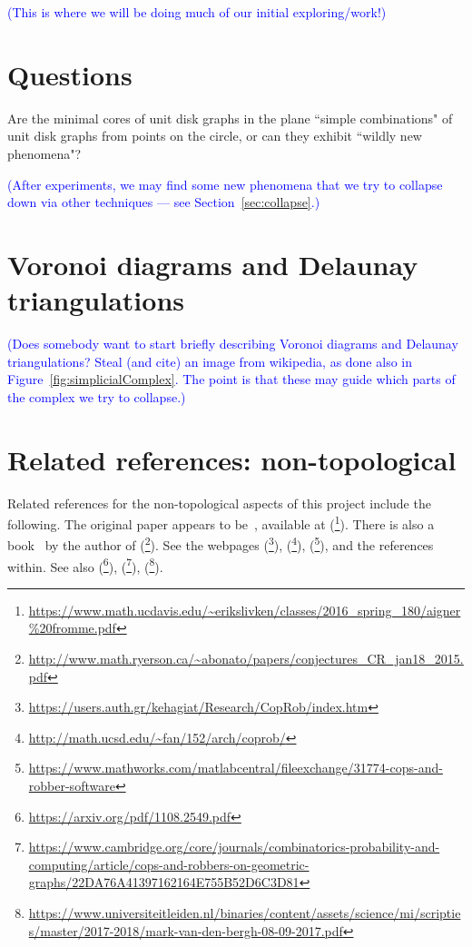 \documentclass[amscd, amssymb, verbatim]{amsart}[12pt]
\newcommand{\note}[1]{\textcolor{blue}{({#1})}}
\theoremstyle{plain}
\theoremstyle{definition}
\begin{document}
\note{This is where we will be doing much of our initial exploring/work!}



\section{Questions}

Are the minimal cores of unit disk graphs in the plane ``simple combinations" of unit disk graphs from points on the circle, or can they exhibit ``wildly new phenomena"?

\note{After experiments, we may find some new phenomena that we try to collapse down via other techniques --- see Section~\ref{sec:collapse}.}



\section{Voronoi diagrams and Delaunay triangulations}

\note{Does somebody want to start briefly describing Voronoi diagrams and Delaunay triangulations?
Steal (and cite) an image from wikipedia, as done also in Figure~\ref{fig:simplicialComplex}. The point is that these may guide which parts of the complex we try to collapse.}



\section{Related references: non-topological}

Related references for the non-topological aspects of this project include the following.
The original paper appears to be~\cite{aigner1984game}, available at (\footnote{\url{https://www.math.ucdavis.edu/~erikslivken/classes/2016\_spring\_180/aigner\%20fromme.pdf}}). There is also a book~\cite{bonato2011game} by the author of (\footnote{\url{http://www.math.ryerson.ca/~abonato/papers/conjectures\_CR\_jan18\_2015.pdf}}). See the webpages (\footnote{\url{https://users.auth.gr/kehagiat/Research/CopRob/index.htm}}), (\footnote{\url{http://math.ucsd.edu/~fan/152/arch/coprob/}}), (\footnote{\url{https://www.mathworks.com/matlabcentral/fileexchange/31774-cops-and-robber-software}}), and the references within. See also (\footnote{\url{https://arxiv.org/pdf/1108.2549.pdf}}), (\footnote{\url{https://www.cambridge.org/core/journals/combinatorics-probability-and-computing/article/cops-and-robbers-on-geometric-graphs/22DA76A41397162164E755B52D6C3D81}}), (\footnote{\url{https://www.universiteitleiden.nl/binaries/content/assets/science/mi/scripties/master/2017-2018/mark-van-den-bergh-08-09-2017.pdf}}).
\end{document}
